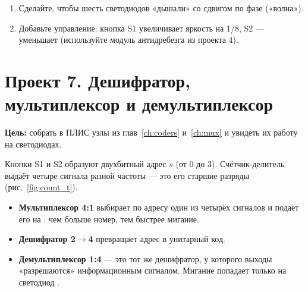 \begin{taskbox}
\begin{enumerate}
  \item Сделайте, чтобы шесть светодиодов «дышали» со сдвигом по фазе
        («волна»).
  \item Добавьте управление: кнопка S1 увеличивает яркость на 1/8, S2 ---
        уменьшает (используйте модуль антидребезга из проекта 4).
\end{enumerate}
\end{taskbox}

\section{Проект 7. Дешифратор, мультиплексор и демультиплексор}

\textbf{Цель:} собрать в ПЛИС узлы из глав~\ref{ch:coders} и~\ref{ch:mux} и
увидеть их работу на светодиодах.

Кнопки S1 и S2 образуют двухбитный адрес $s$ (от 0 до 3). Счётчик-делитель
выдаёт четыре сигнала разной частоты --- это его старшие разряды
(рис.~\ref{fig:count_t}).
\begin{itemize}
  \item \textbf{Мультиплексор 4:1} выбирает по адресу один из четырёх сигналов
        и подаёт его на : чем больше номер, тем быстрее мигание.
  \item \textbf{Дешифратор 2$\to$4} превращает адрес в унитарный код.
  \item \textbf{Демультиплексор 1:4} --- это тот же дешифратор, у которого
        выходы «разрешаются» информационным сигналом. Мигание попадает только
        на светодиод .
\end{itemize}

